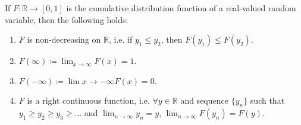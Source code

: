 \begin{theorem}
If $F : \mathbb{R} \rightarrow [0, 1]$ is the cumulative distribution function
of a real-valued random variable, then the following holds:
\begin{enumerate}[noitemsep, topsep=0em]
\item \label{ref-sec4-thm1-1}
    $F$ is non-decreasing on $\mathbb{R}$, i.e. if $y_1 \leq y_2$, then
$F(y_1) \leq F(y_2)$.
\item \label{ref-sec4-thm1-2}
    $F(\infty) \coloneqq \lim_{x \rightarrow \infty} F(x) = 1$.
\item \label{ref_sec4-thm1-3}
    $F(-\infty) \coloneqq \lim{x \rightarrow -\infty} F(x) = 0$.
\item \label{ref_sec4-thm1-4}
    $F$ is a right continuous function, i.e. $\forall y \in \mathbb{R}$ and
sequence $\lbrace y_n \rbrace$ such that $y_1 \geq y_2 \geq y_3 \geq
\dots$ and $\lim_{n \rightarrow \infty} y_n = y$, $\lim_{n \rightarrow \infty}
F(y_n) = F(y)$.
\end{enumerate}
\end{theorem}
